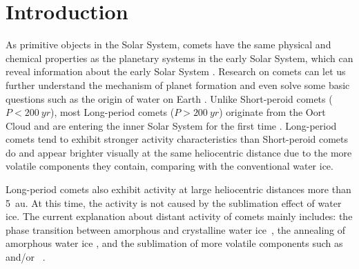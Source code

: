 \section{Introduction}

As primitive objects in the Solar System, comets have the same physical and chemical properties as the planetary systems in the early Solar System, which can reveal information about the early Solar System \citep{mazzotta_epifani_distant_2009, solontoi_ensemble_2012}. Research on comets can let us further understand the mechanism of planet formation and even solve some basic questions such as the origin of water on Earth \citep{alexander_water_2018}. Unlike Short-peroid comets ($P<\qty{200}{yr}$), most Long-period comets ($P>\qty{200}{yr}$) originate from the Oort Cloud and are entering the inner Solar System for the first time \citep{jewittCOLORSYSTEMATICSCOMETS2015}. Long-period comets tend to exhibit stronger activity characteristics than Short-peroid comets do and appear brighter visually at the same heliocentric distance due to the more volatile components they contain, comparing with the conventional water ice. 

Long-period comets also exhibit activity at large heliocentric distances more than {\qty{5}{\astronomicalunit}}. At this time, the activity is not caused by the sublimation effect of water ice. The current explanation about distant activity of comets mainly includes: the phase transition between amorphous and crystalline water ice~\citep{prialnik_crystallization_1992, capria_c1995_2002}, the annealing of amorphous water ice \citep{meech_activity_2009}, and the sublimation of more volatile components such as ~\citep{ootsubo_akari_2012} and/or ~\citep{jewitt_distant_2019}. 


